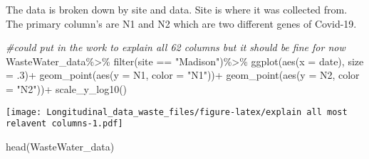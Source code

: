 \documentclass[
]{article}
\newenvironment{Shaded}{\begin{snugshade}}{\end{snugshade}}
\newcommand{\AttributeTok}[1]{\textcolor[rgb]{0.77,0.63,0.00}{#1}}
\newcommand{\CommentTok}[1]{\textcolor[rgb]{0.56,0.35,0.01}{\textit{#1}}}
\newcommand{\DecValTok}[1]{\textcolor[rgb]{0.00,0.00,0.81}{#1}}
\newcommand{\FunctionTok}[1]{\textcolor[rgb]{0.00,0.00,0.00}{#1}}
\newcommand{\NormalTok}[1]{#1}
\newcommand{\SpecialCharTok}[1]{\textcolor[rgb]{0.00,0.00,0.00}{#1}}
\newcommand{\StringTok}[1]{\textcolor[rgb]{0.31,0.60,0.02}{#1}}
\begin{document}
The data is broken down by site and data. Site is where it was collected
from. The primary column's are N1 and N2 which are two different genes
of Covid-19.

\begin{Shaded}
\begin{Highlighting}[]
\CommentTok{\#could put in the work to explain all 62 columns but it should be fine for now}
\NormalTok{WasteWater\_data}\SpecialCharTok{\%\textgreater{}\%}
  \FunctionTok{filter}\NormalTok{(site }\SpecialCharTok{==} \StringTok{"Madison"}\NormalTok{)}\SpecialCharTok{\%\textgreater{}\%}
  \FunctionTok{ggplot}\NormalTok{(}\FunctionTok{aes}\NormalTok{(}\AttributeTok{x =}\NormalTok{ date), }\AttributeTok{size =}\NormalTok{ .}\DecValTok{3}\NormalTok{)}\SpecialCharTok{+}
  \FunctionTok{geom\_point}\NormalTok{(}\FunctionTok{aes}\NormalTok{(}\AttributeTok{y =}\NormalTok{ N1, }\AttributeTok{color =} \StringTok{"N1"}\NormalTok{))}\SpecialCharTok{+}
  \FunctionTok{geom\_point}\NormalTok{(}\FunctionTok{aes}\NormalTok{(}\AttributeTok{y =}\NormalTok{ N2, }\AttributeTok{color =} \StringTok{"N2"}\NormalTok{))}\SpecialCharTok{+}
  \FunctionTok{scale\_y\_log10}\NormalTok{()}
\end{Highlighting}
\end{Shaded}

\texttt{[image: Longitudinal\_data\_waste\_files/figure-latex/explain all most relavent columns-1.pdf]}

\begin{Shaded}
\begin{Highlighting}[]
\FunctionTok{head}\NormalTok{(WasteWater\_data)}
\end{Highlighting}
\end{Shaded}
\end{document}
